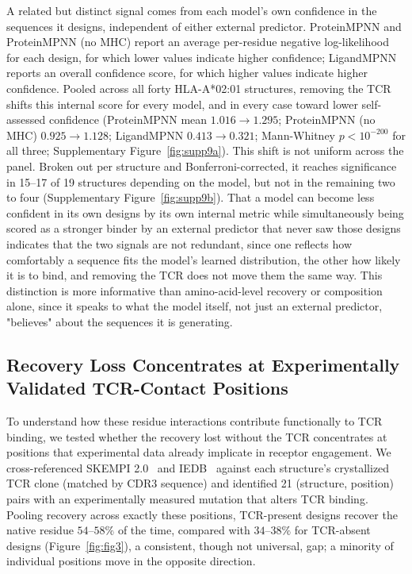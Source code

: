 \documentclass[letterpaper]{article}
\begin{document}
A related but distinct signal comes from each model's own confidence in the sequences it designs,
independent of either external predictor. ProteinMPNN and ProteinMPNN (no MHC) report an average
per-residue negative log-likelihood for each design, for which lower values indicate higher confidence;
LigandMPNN reports an overall confidence score, for which higher values indicate higher confidence.
Pooled across all forty HLA-A*02:01 structures, removing the TCR shifts this internal score for every
model, and in every case toward lower self-assessed confidence (ProteinMPNN mean $1.016\to1.295$;
ProteinMPNN (no MHC) $0.925\to1.128$; LigandMPNN $0.413\to0.321$; Mann-Whitney $p<10^{-200}$ for all
three; Supplementary Figure~\ref{fig:supp9a}). This shift is not uniform across the panel. Broken out per
structure and Bonferroni-corrected, it reaches significance in 15--17 of 19 structures depending on the
model, but not in the remaining two to four (Supplementary Figure~\ref{fig:supp9b}). That a model can
become less confident in its own designs by its own internal metric while simultaneously being scored as
a stronger binder by an external predictor that never saw those designs indicates that the two signals
are not redundant, since one reflects how comfortably a sequence fits the model's learned distribution, the
other how likely it is to bind, and removing the TCR does not move them the same way. This distinction is
more informative than amino-acid-level recovery or composition alone, since it speaks to what the model
itself, not just an external predictor, "believes" about the sequences it is generating.

\subsection{Recovery Loss Concentrates at Experimentally Validated TCR-Contact Positions}
\label{sec:skempi}

To understand how these residue interactions contribute functionally to TCR binding, we tested whether
the recovery lost without the TCR concentrates at positions that experimental data already implicate in
receptor engagement. We cross-referenced SKEMPI 2.0~\citep{jankauskaite2019skempi} and IEDB~\citep{vita2019iedb} against each structure's
crystallized TCR clone (matched by CDR3 sequence) and identified 21 (structure, position) pairs with an
experimentally measured mutation that alters TCR binding. Pooling recovery across exactly these
positions, TCR-present designs recover the native residue $54$--$58\%$ of the time, compared with
$34$--$38\%$ for TCR-absent designs (Figure~\ref{fig:fig3}), a consistent, though not universal, gap; a
minority of individual positions move in the opposite direction.
\end{document}

